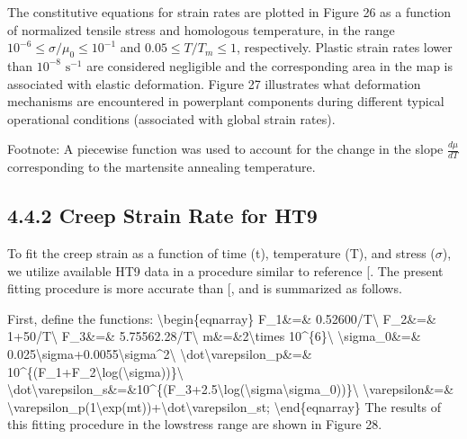 \documentclass[letterpaper,10pt,english]{jupyterBook}
\begin{document}
	\sphinxAtStartPar
	The constitutive equations for strain rates are plotted in Figure 26 as a function of normalized tensile stress and homologous temperature, in the range \(10^{-6}\le\sigma/\mu_0\le10^{-1}\) and \(0.05\le T/T_m\le 1\), respectively. Plastic strain rates lower than \(10^{-8}\)  \(\mathrm{s}^{-1}\) are considered negligible and the corresponding area in the map is associated with elastic deformation. Figure 27 illustrates what deformation mechanisms are encountered in power\sphinxhyphen{}plant components during different typical operational conditions (associated with global strain rates).
	
	\sphinxAtStartPar
	Footnote: A piecewise function was used to account for the change in the slope \(\frac{d\mu}{dT}\) corresponding to the martensite annealing temperature.
	
	
	\subsection{4.4.2 Creep Strain Rate for HT\sphinxhyphen{}9}
	\label{\detokenize{4 Mechanical Properties:creep-strain-rate-for-ht-9}}
	\sphinxAtStartPar
	To fit the creep strain as a function of time (t), temperature (T), and stress (\(\sigma\)), we utilize available HT9 data in a procedure similar to reference {[}\sphinxhref{https://drive.google.com/file/d/1FutUp6NxT3pc8PDVEvy2kEgLKaPej-nK/view?usp=drive\_link}{Ryu2011}{]}. The present fitting procedure is more accurate than {[}\sphinxhref{https://drive.google.com/file/d/1FutUp6NxT3pc8PDVEvy2kEgLKaPej-nK/view?usp=drive\_link}{Ryu2011}{]}, and is summarized as follows.
	
	\sphinxAtStartPar
	First, define the functions:
	\textbackslash{}begin\{eqnarray\}
	F\_1\&=\& 0.5\sphinxhyphen{}2600/T\textbackslash{}
	F\_2\&=\& 1+50/T\textbackslash{}
	F\_3\&=\& \sphinxhyphen{}5.7\sphinxhyphen{}5562.28/T\textbackslash{}
	m\&=\&2\textbackslash{}times 10\textasciicircum{}\{\sphinxhyphen{}6\}\textbackslash{}
	\textbackslash{}sigma\_0\&=\& 0.025\textbackslash{}sigma+0.0055\textbackslash{}sigma\textasciicircum{}2\textbackslash{}
	\textbackslash{}dot\textbackslash{}varepsilon\_p\&=\& 10\textasciicircum{}\{(F\_1+F\_2\textbackslash{}log(\textbackslash{}sigma))\}\textbackslash{}
	\textbackslash{}dot\textbackslash{}varepsilon\_s\&=\&10\textasciicircum{}\{(F\_3+2.5\textbackslash{}log(\textbackslash{}sigma\sphinxhyphen{}\textbackslash{}sigma\_0))\}\textbackslash{}
	\textbackslash{}varepsilon\&=\& \textbackslash{}varepsilon\_p(1\sphinxhyphen{}\textbackslash{}exp(\sphinxhyphen{}mt))+\textbackslash{}dot\textbackslash{}varepsilon\_st;
	\textbackslash{}end\{eqnarray\}
	The results of this fitting procedure in the low\sphinxhyphen{}stress range are shown in Figure 28.
	
\end{document}
